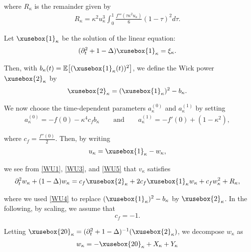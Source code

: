 \documentclass[%
11pt,  reqno]{amsart}
\def\<#1>{\xusebox{#1}}
\newcommand{\1}{\hspace{0.2mm}\text{I}\hspace{0.2mm}}
\newcommand{\noi}{\noindent}
\newcommand{\E}{\mathbb{E}}
\newcommand{\Dl}{\Delta}
\newcommand{\kk}{\kappa}
\newcommand{\dt}{\partial_t}
\numberwithin{equation}{section}
\numberwithin{theorem}{section}
\begin{document}
\noi
where $R_{\kk}$ is the remainder given by 
\begin{align}
 R_{\kk} = \kk^2 u_{\kk}^3 \int_0^1 \frac{ f'''
   (\tau \kk^2 u_{\kk})}{6}  (1 - \tau)^2  d\tau . 
\label{WU3}
\end{align}

Let  $\<1>_{\kk}$ be the solution of the linear equation:
\begin{align}
 (\partial_t^2  + 1 - \Delta) \<1>_\kk = \xi_{\kk}. 
\label{WU3a}
 \end{align}

\noi
Then, with  $b_\kk(t) = \E\big[(\<1>_\kk(t))^2\big]$, 
we define the Wick power $\<2>_\kk$ by 
\begin{align}
 \<2>_\kk = (\<1>_\kk)^2 - b_{\kk}.
\label{WU4}
\end{align}


\noi
We now choose the time-dependent parameters $a_\kk^{(0)}$ and $a_\kk^{(1)}$ 
by setting
\begin{align}
\label{WU5}
 a^{(0)}_{\kk} = - f (0) -  \kk^4 c_f b_{\kk}
 \qquad\text{and}\qquad
a^{(1)}_{\kk} = - f' (0) + (1 - \kk^2), 
\end{align}

\noi
where $c_f =  \frac{f'' (0)}{2}$.
Then, by writing
\begin{align*}
u_{\kk} =  \<1>_\kk -  w_{\kk}, 
\end{align*}

\noi
we see from \eqref{WU1}, \eqref{WU3}, and \eqref{WU5} that $v_\kk$ satisfies
\begin{align}
 \partial_t^2 w_{\kk}  + (1 - \Dl) w_{\kk} 
= c_f \<2>_\kk + 2c_f  \<1>_{\kk}  w_{\kk} +
 c_f  w_{\kk}^2 + R_{\kk}, 
\label{WU6}
\end{align}

\noi
where we used \eqref{WU4}
to replace $(\<1>_\kk)^2 - b_{\kk}$ by $ \<2>_\kk$.
In the following, by scaling, 
we assume that 
\[c_f = -1.\]



Letting $\<20>_\kk = (\dt^2 + 1 - \Dl)^{-1} (\<2>_\kk)$, 
we decompose $w_\kk$ as 
\begin{align*}
w_\kk = - \<20>_\kk + X_\kk + Y_\kk
\end{align*}
\end{document}
